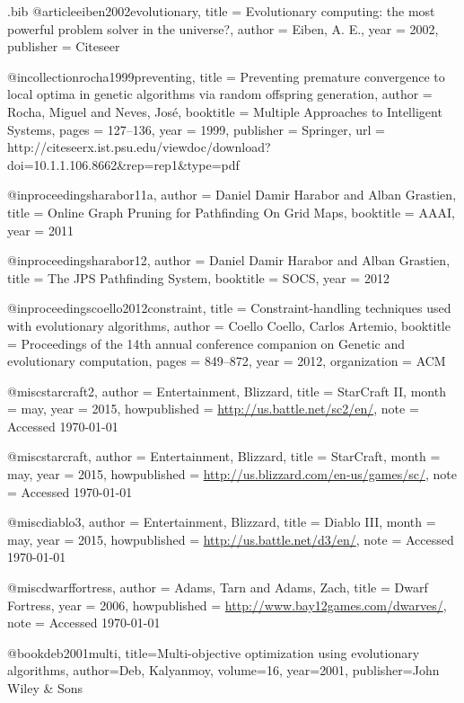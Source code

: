 \begin{filecontents*}{\jobname.bib}
@article{eiben2002evolutionary,
	title		= {{E}volutionary {c}omputing: {t}he {m}ost {p}owerful {p}roblem {s}olver in the {u}niverse?},
	author	= {Eiben, A. E.},
	year		= {2002},
	publisher	= {Citeseer}
}

@incollection{rocha1999preventing,
	title		= {{P}reventing {p}remature {c}onvergence to {l}ocal {o}ptima in {g}enetic {a}lgorithms via {r}andom {o}ffspring {g}eneration},
	author	= {Rocha, Miguel and Neves, Jos{\'e}},
	booktitle	= {Multiple Approaches to Intelligent Systems},
	pages		= {127--136},
	year		= {1999},
	publisher	= {Springer},
	url 		= {http://citeseerx.ist.psu.edu/viewdoc/download?doi=10.1.1.106.8662&rep=rep1&type=pdf}
}

@inproceedings{harabor11a,
	author	= {Daniel Damir Harabor and Alban Grastien},
	title     	= {{O}nline {G}raph {P}runing for {P}athfinding {O}n {G}rid {M}aps},
	booktitle 	= {AAAI},
	year      	= {2011}
}

@inproceedings{harabor12,
	author    	= {Daniel Damir Harabor and Alban Grastien},
	title     	= {{T}he {J}{P}{S} {P}athfinding {S}ystem},
	booktitle 	= {SOCS},
	year      	= {2012}
}

@inproceedings{coello2012constraint,
	title		= {{C}onstraint-{h}andling {t}echniques used with {e}volutionary {a}lgorithms},
	author	= {Coello Coello, Carlos Artemio},
	booktitle	= {Proceedings of the 14th annual conference companion on Genetic and evolutionary computation},
	pages		= {849--872},
	year		= {2012},
	organization	= {ACM}
}

@misc{starcraft2,
	author 	= {Entertainment, Blizzard},
	title 		= {StarCraft II},
	month 	= may,
	year 		= {2015},
	howpublished = {\url{http://us.battle.net/sc2/en/}},
	note  		= {Accessed \today}
}

@misc{starcraft,
	author 	= {Entertainment, Blizzard},
	title 		= {StarCraft},
	month 	= may,
	year 		= {2015},
	howpublished = {\url{http://us.blizzard.com/en-us/games/sc/}},
	note  		= {Accessed \today}
}

@misc{diablo3,
	author 	= {Entertainment, Blizzard},
	title 		= {Diablo III},
	month 	= may,
	year 		= {2015},
	howpublished = {\url{http://us.battle.net/d3/en/}},
	note  		= {Accessed \today}
}

@misc{dwarffortress,
	author 	= {Adams, Tarn and Adams, Zach},
	title 		= {{D}warf {F}ortress},
	year 		= {2006}, 
	howpublished = {\url{http://www.bay12games.com/dwarves/}},
	note		= {Accessed \today}
}

@book{deb2001multi,
  title={Multi-objective optimization using evolutionary algorithms},
  author={Deb, Kalyanmoy},
  volume={16},
  year={2001},
  publisher={John Wiley \& Sons}
}


\end{filecontents*}
